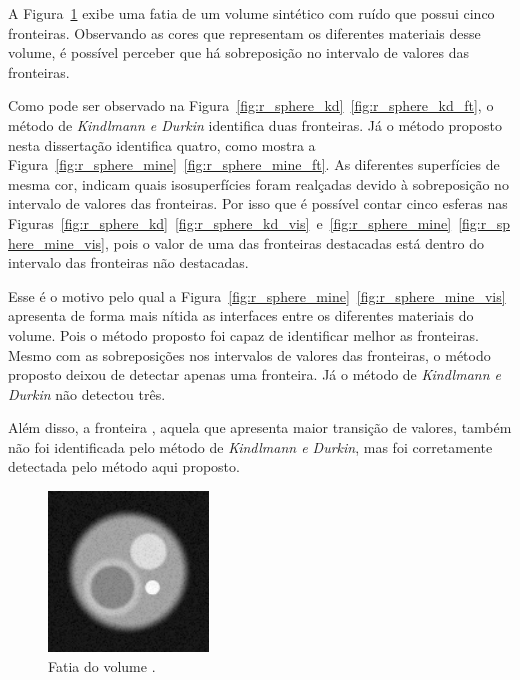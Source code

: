	A Figura~\ref{fig:r_sphere_slice} exibe uma fatia de um volume sintético com ruído que possui cinco fronteiras. Observando as cores que representam os diferentes materiais desse volume, é possível perceber que há sobreposição no intervalo de valores das fronteiras.
	
	Como pode ser observado na Figura~\ref{fig:r_sphere_kd}~\ref{fig:r_sphere_kd_ft}, o método de \textit{Kindlmann e Durkin} identifica duas fronteiras. Já o método proposto nesta dissertação identifica quatro, como mostra a Figura~\ref{fig:r_sphere_mine}~\ref{fig:r_sphere_mine_ft}. As diferentes superfícies de mesma cor, indicam quais isosuperfícies foram realçadas devido à sobreposição no intervalo de valores das fronteiras. Por isso que é possível contar cinco esferas nas Figuras~\ref{fig:r_sphere_kd}~\ref{fig:r_sphere_kd_vis}~e~\ref{fig:r_sphere_mine}~\ref{fig:r_sphere_mine_vis}, pois o valor de uma das fronteiras destacadas está dentro do intervalo das fronteiras não destacadas.
	
	Esse é o motivo pelo qual a Figura~\ref{fig:r_sphere_mine}~\ref{fig:r_sphere_mine_vis} apresenta de forma mais nítida as interfaces entre os diferentes materiais do volume. Pois o método proposto foi capaz de identificar melhor as fronteiras. Mesmo com as sobreposições nos intervalos de valores das fronteiras, o método proposto deixou de detectar apenas uma fronteira. Já o método de \textit{Kindlmann e Durkin} não detectou três.
	
	Além disso, a fronteira , aquela que apresenta maior transição de valores, também não foi identificada pelo método de \textit{Kindlmann e Durkin}, mas foi corretamente detectada pelo método aqui proposto.
	
\begin{figure}[h]
	\centering
	\includegraphics[width=0.38\textwidth]{images/r_3sphere_slice}
	\caption{Fatia do volume .}
	\label{fig:r_sphere_slice}
\end{figure}


